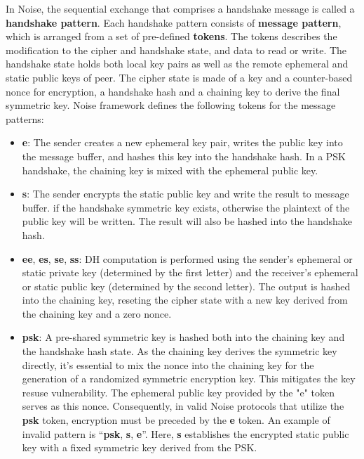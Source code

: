   In Noise, the sequential exchange that comprises a handshake message is called a \textbf{handshake pattern}.
  Each handshake pattern consists of \textbf{message pattern}, which is arranged from a set of 
  pre-defined \textbf{tokens}. The tokens describes the modification to the cipher and handshake state, and
  data to read or write. The handshake state holds both local key pairs as well as the remote ephemeral 
  and static public keys of peer. The cipher state is made of a key and a counter-based nonce for 
  encryption, a handshake hash and a chaining key to derive the final symmetric key.  Noise framework 
  defines the following tokens for the message patterns:
  \begin{itemize}
    \item \textbf{e}: The sender creates a new ephemeral key pair, writes the public key into the 
    message buffer, and hashes this key into the handshake hash. In a PSK handshake, the chaining
    key is mixed with the ephemeral public key.
    \item \textbf{s}: The sender encrypts the static public key and write the result to message buffer. 
    if the handshake symmetric key exists, otherwise the plaintext of the public key will be written.
    The result will also be hashed into the handshake hash.
    \item \textbf{ee}, \textbf{es}, \textbf{se}, \textbf{ss}: DH computation is performed using
    the sender's ephemeral or static private key (determined by the first letter) and the receiver's
    ephemeral or static public key (determined by the second letter). The output is hashed into
    the chaining key, reseting the cipher state with a new key derived from the chaining key and 
    a zero nonce.
    \item \textbf{psk}: A pre-shared symmetric key is hashed both into the chaining key and the
    handshake hash state. As the chaining key derives the symmetric key directly, it's essential
    to mix the nonce into the chaining key for the generation of a randomized symmetric encryption
    key. This mitigates the key resuse vulnerability. The ephemeral public key provided by the "e" 
    token serves as this nonce. Consequently, in valid Noise protocols that utilize the \textbf{psk} token, 
    encryption must be preceded by the \textbf{e} token. An example of invalid pattern is 
    ``\textbf{psk}, \textbf{s}, \textbf{e}''. Here, \textbf{s} establishes the encrypted static
    public key with a fixed symmetric key derived from the PSK.
  \end{itemize}


